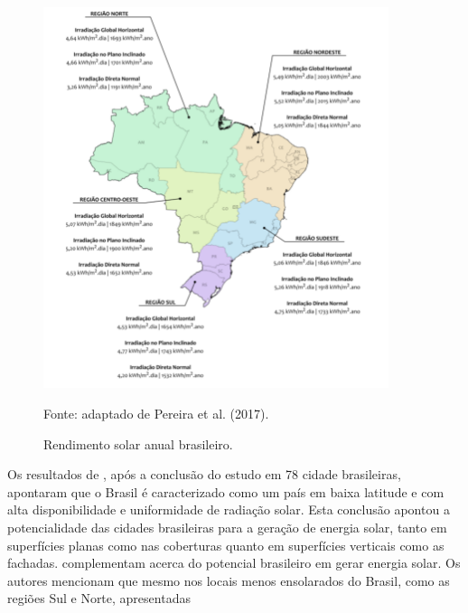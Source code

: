 \begin{onehalfspace}
    \begin{figure}[ht]
        \centering
        \caption{\small Rendimento solar anual brasileiro.}
        \includegraphics[width=0.9\textwidth]{figures/fig3-niveis_de_irradiacao_por_regiao_brasileira_pereira_et_al_2017.png}
            \begin{flushleft}
                \par \small Fonte: adaptado de Pereira et al. (2017).
            \end{flushleft}
        \label{Figura 3}
    \end{figure}\vspace*{-0.4cm}
    \noindent Os resultados de \textcite{Cronemberger2012}, após a conclusão do estudo em 78 cidade brasileiras, 
    apontaram que o Brasil é caracterizado como um país em baixa latitude e com alta disponibilidade 
    e uniformidade de radiação solar. Esta conclusão apontou a potencialidade das cidades brasileiras 
    para a geração de energia solar, tanto em superfícies planas como nas coberturas quanto em superfícies 
    verticais como as fachadas.\vspace{0.3cm} \newline
    \textcite{Pereira2017} complementam acerca do potencial brasileiro em gerar energia solar. Os autores 
    mencionam que mesmo nos locais menos ensolarados do Brasil, como as regiões Sul e Norte, apresentadas 

\end{onehalfspace}
